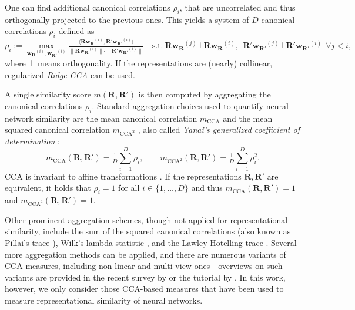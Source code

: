 \documentclass{article}
\newcommand{\citet}{\textcite}
\newcommand{\R}{\bm{R}}
\newcommand{\Rp}{\bm{R'}}
\begin{document}
One can find additional canonical correlations $\rho_i$, that are uncorrelated and thus orthogonally projected to the previous ones.
This yields a system of $D$ canonical correlations $\rho_i$ defined as
\begin{equation}
    \rho_i := \max_{\bm{w_{\R}}^{(i)},\bm{w_{\Rp}}^{(i)}} \tfrac{\langle \R \bm{w_{\R}}^{(i)}, \Rp \bm{w_{\Rp}}^{(i)} \rangle}{\|\R\bm{w_{\R}}^{(i)}\| \cdot \|\Rp\bm{w_{\Rp}}^{(i)}\|} \quad
    \mathrm{s.t.}~ \R\bm{w_{\R}}^{(j)} \bot \R\bm{w_{\R}}^{(i)},~~\Rp\bm{w_{\Rp}}^{(j)} \bot \Rp\bm{w_{\Rp}}^{(i)}~~ \forall j < i,
\end{equation}
where $\bot$ means orthogonality.
If the representations are (nearly) collinear, regularized \emph{Ridge CCA} \cite{vinod_canonical_1976} can be used.

A single similarity score $m(\R, \Rp)$ is then computed by aggregating the canonical correlations $\rho_i$.
Standard aggregation choices used to quantify neural network similarity are the mean canonical correlation $m_{\operatorname{CCA}}$ \cite{raghu_svcca_2017,kornblith_similarity_2019,hayne2024does} and the mean squared canonical correlation $m_{\operatorname{CCA}^2}$ \cite{kornblith_similarity_2019,hayne2024does}, also called \emph{Yanai's generalized coefficient of determination} \cite{yanai_unification_1974}:
\begin{equation}\label{eq:mean_cca}
    m_{\operatorname{CCA}}(\R,\Rp) = \tfrac{1}{D} \textstyle\sum_{i=1}^D \rho_i, \qquad m_{\operatorname{CCA}^2}(\R,\Rp) = \tfrac{1}{D} \textstyle\sum_{i=1}^D \rho_i^2.
\end{equation}
CCA is invariant to affine transformations \cite{morcos_insights_2018}. If the representations $\R,\Rp$ are equivalent, it holds that $\rho_i=1$ for all $i\in\{1,\dots, D\}$ and thus $m_{\operatorname{CCA}}(\R,\Rp) = 1$ and  $m_{\operatorname{CCA}^2}(\R,\Rp) = 1$.

Other prominent aggregation schemes, though not applied for representational similarity, include the sum of the squared canonical correlations (also known as Pillai's trace \cite{pillai_new_1955}),
Wilk's lambda statistic \cite{wilks_certain_1932},
and the Lawley-Hotelling trace \cite{lawley_generalization_1938,hotelling_most_1935}.
Several more aggregation methods can be applied, and there are numerous variants of CCA measures, including non-linear and multi-view ones---overviews on such variants are provided in the recent survey by \citet{yang_survey_2021} or the tutorial by \citet{uurtio_tutorial_2017}.
In this work, however, we only consider those CCA-based measures that have been used to measure representational similarity of neural networks.
\end{document}
